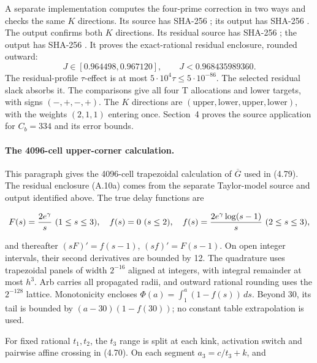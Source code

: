 {A separate implementation computes the four-prime correction in two ways
and checks the same $K$ directions. Its source 
has SHA-256
;
its output  has SHA-256
.
The output confirms both $K$ directions. Its residual source 
has SHA-256
;
the output  has SHA-256
.
It proves the exact-rational residual enclosure, rounded outward:
\[
 J\in[0.964498,0.967120],\qquad J<0.968435989360.                                \tag{A.10a}
\]
The residual-profile $\tau$-effect is at most
$5\cdot10^4\tau\le5\cdot10^{-86}$. The selected residual slack absorbs it.
The comparisons give all four T allocations and lower targets,
with signs $(-,+,-,+)$.
The $K$ directions are
$(\mathrm{upper},\mathrm{lower},\mathrm{upper},\mathrm{lower})$,
with the weights $(2,1,1)$ entering once. Section~4 proves the source application for
$C_b=334$ and its error bounds.

\paragraph{The 4096-cell upper-corner calculation.}
This paragraph gives the 4096-cell trapezoidal calculation of $\overline G$ used in (4.79).
The residual enclosure (A.10a) comes from the separate Taylor-model source and output identified above.
The true delay functions are

\[
 F(s)={2e^\gamma\over s}\ (1\le s\le3),\quad
 f(s)=0\ (s\le2),\quad
 f(s)={2e^\gamma\log(s-1)\over s}\ (2\le s\le3),
\]

and thereafter $(sF)'=f(s-1)$, $(sf)'=F(s-1)$.
On open integer intervals, their second derivatives are bounded by 12.
The quadrature uses trapezoidal panels of width $2^{-16}$ aligned at integers,
with integral remainder at most $h^3$.
Arb carries all propagated radii, and outward rational rounding uses the
$2^{-128}$ lattice.
Monotonicity encloses $\Phi(a)=\int_1^a(1-f(s))\,ds$. Beyond 30, its tail is bounded by
$(a-30)(1-f(30))$; no constant table extrapolation is used.

For fixed rational $t_1,t_2$, the $t_3$ range is split at each kink,
activation switch and pairwise affine crossing in (4.70).
On each segment $a_3=c/t_3+k$, and

}

